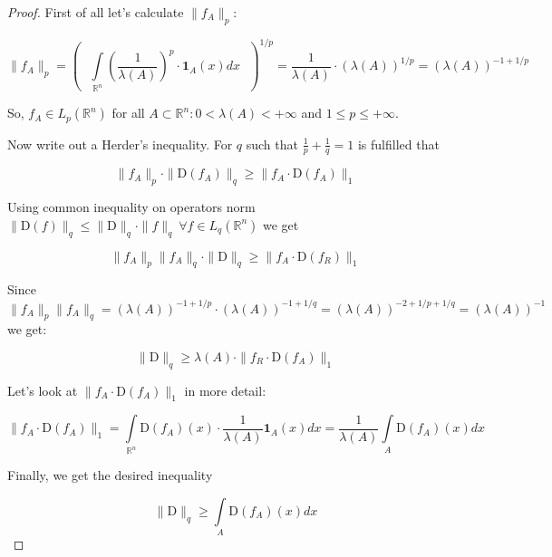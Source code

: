 \documentclass{article}
\begin{document}
    \begin{proof}
        First of all let's calculate $\|f_A\|_p$:

        \begin{equation*}
            \|f_A\|_p = \left( \text{ } \int\limits_{\mathbb{R}^n}\left(\dfrac{1}{\lambda(A)}\right)^p \cdot \textbf{1}_{A}(x) dx \text{ } \right)^{1/p} = \dfrac{1}{\lambda(A)} \cdot (\lambda(A))^{1/p} = (\lambda(A))^{-1 + 1/p}
        \end{equation*}

        So, $f_A \in L_p(\mathbb{R}^n)$ for all $A \subset \mathbb{R}^n : 0 < \lambda(A) < +\infty$ and $1 \leq p \leq +\infty$. 

        Now write out a Herder's inequality. For $q$ such that $\frac{1}{p} + \frac{1}{q} = 1$ is fulfilled that

        \begin{equation*}
            \|f_A\|_p \cdot \|\text{D}(f_A)\|_q \geq \|f_A \cdot \text{D}(f_A)\|_1
        \end{equation*}

        Using common inequality on operators norm $\|\text{D}(f)\|_q \leq \|\text{D}\|_q \cdot \|f\|_q ~\forall f \in L_q(\mathbb{R}^n)$ we get

        \begin{equation*}
            \|f_A\|_p \|f_A\|_q \cdot \|\text{D}\|_q \geq \|f_A \cdot \text{D}(f_R)\|_1
        \end{equation*}

        Since $\|f_A\|_p \|f_A\|_q = (\lambda(A))^{-1 + 1/p} \cdot (\lambda(A))^{-1 + 1/q} = (\lambda(A))^{-2 + 1/p + 1/q} = (\lambda(A))^{-1}$ we get:

        \begin{equation*}
            \|\text{D}\|_q \geq \lambda(A) \cdot \|f_R \cdot \text{D}(f_A)\|_1
        \end{equation*}

        Let's look at $\|f_A \cdot \text{D}(f_A)\|_1$ in more detail:

        \begin{equation*}
            \|f_A \cdot \text{D}(f_A)\|_1 = \int\limits_{\mathbb{R}^n} \text{D}(f_A)(x) \cdot \dfrac{1}{\lambda(A)} \textbf{1}_{A}(x) dx = \dfrac{1}{\lambda(A)} \int\limits_{A} \text{D}(f_A)(x)dx
        \end{equation*}

        Finally, we get the desired inequality

        \begin{equation*}
            \|\text{D}\|_q \geq \int\limits_{A} \text{D}(f_A)(x)dx
        \end{equation*}
    \end{proof}
        
\end{document}
